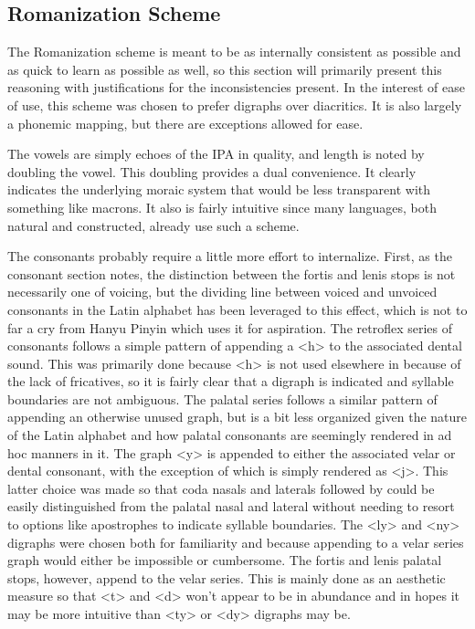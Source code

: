   \subsection{Romanization Scheme}
  The Romanization scheme is meant to be as internally consistent as possible and as quick to learn as possible as well, so this section will primarily present this reasoning with justifications for the inconsistencies present. In the interest of ease of use, this scheme was chosen to prefer digraphs over diacritics. It is also largely a phonemic mapping, but there are exceptions allowed for ease.\par
  The vowels are simply echoes of the IPA in quality, and length is noted by doubling the vowel. This doubling provides a dual convenience. It clearly indicates the underlying moraic system that would be less transparent with something like macrons. It also is fairly intuitive since many languages, both natural and constructed, already use such a scheme.\par
  The consonants probably require a little more effort to internalize. First, as the consonant section notes, the distinction between the fortis and lenis stops is not necessarily one of voicing, but the dividing line between voiced and unvoiced consonants in the Latin alphabet has been leveraged to this effect, which is not to far a cry from Hanyu Pinyin which uses it for aspiration. The retroflex series of consonants follows a simple pattern of appending a <h> to the associated dental sound. This was primarily done because <h> is not used elsewhere in \langname because of the lack of fricatives, so it is fairly clear that a digraph is indicated and syllable boundaries are not ambiguous. The palatal series follows a similar pattern of appending an otherwise unused graph, but is a bit less organized given the nature of the Latin alphabet and how palatal consonants are seemingly rendered in ad hoc manners in it. The graph <y> is appended to either the associated velar or dental consonant, with the exception of  which is simply rendered as <j>. This latter choice was made so that coda nasals and laterals followed by  could be easily distinguished from the palatal nasal and lateral without needing to resort to options like apostrophes to indicate syllable boundaries. The <ly> and <ny> digraphs were chosen both for familiarity and because appending to a velar series graph would either be impossible or cumbersome. The fortis and lenis palatal stops, however, append to the velar series. This is mainly done as an aesthetic measure so that <t> and <d> won't appear to be in abundance and in hopes it may be more intuitive than <ty> or <dy> digraphs may be.\par
